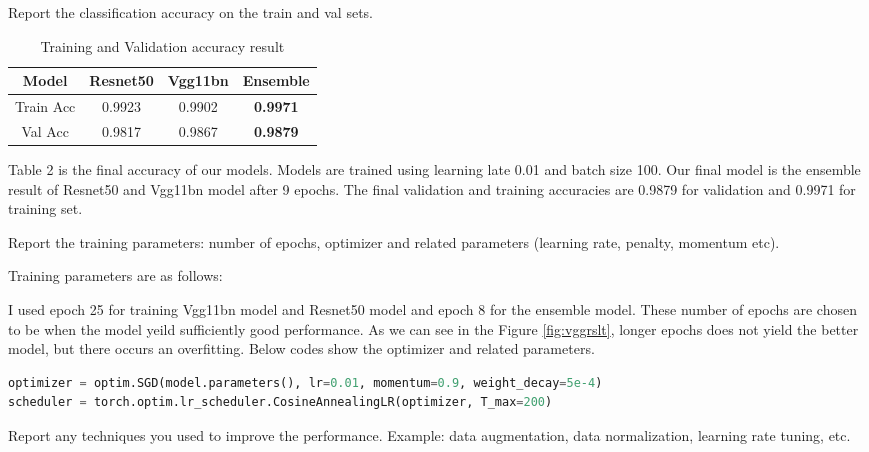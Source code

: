 \documentclass[11pt]{article}
\newcommand{\0}{{\mathbf{0}}}
\newcommand{\1}{{\mathbf{1}}}
\newcommand{\pr}[1]{\noindent{\bf #1.}}
\begin{document}
\pr{3} Report the classification accuracy on the train and val sets.

\begin{table}[h]
\centering
\begin{tabular}[\textwidth]{ | c | c | c | c | }
\hline
Model & Resnet50 & Vgg11bn & Ensemble \\
\hline
Train Acc &  0.9923 & 0.9902  & \textbf{0.9971} \\
Val Acc & 0.9817 & 0.9867  & \textbf{0.9879} \\
\hline
\end{tabular}
\label{Tab:acc}
\caption{Training and Validation accuracy result}
\end{table}

Table 2 is the final accuracy of our models. Models are trained using learning late 0.01 and batch size 100. Our final model is the ensemble result of Resnet50 and Vgg11bn model after 9 epochs. The final validation and training accuracies are 0.9879 for validation and 0.9971 for training set.


\pr{4} Report the training parameters: number of epochs, optimizer and related parameters (learning rate, penalty, momentum etc).

Training parameters are as follows:

I used epoch 25 for training Vgg11bn model and Resnet50 model and epoch 8 for the ensemble model. These number of epochs are chosen to be when the model yeild sufficiently good performance. As we can see in the Figure \ref{fig:vggrslt}, longer epochs does not yield the better model, but there occurs an overfitting. Below codes show the optimizer and related parameters.

\begin{lstlisting}[language=Python]
optimizer = optim.SGD(model.parameters(), lr=0.01, momentum=0.9, weight_decay=5e-4) 
scheduler = torch.optim.lr_scheduler.CosineAnnealingLR(optimizer, T_max=200)
\end{lstlisting}


\pr{5} Report any techniques you used to improve the performance. Example: data augmentation, data normalization, learning rate tuning, etc. 
\end{document}
